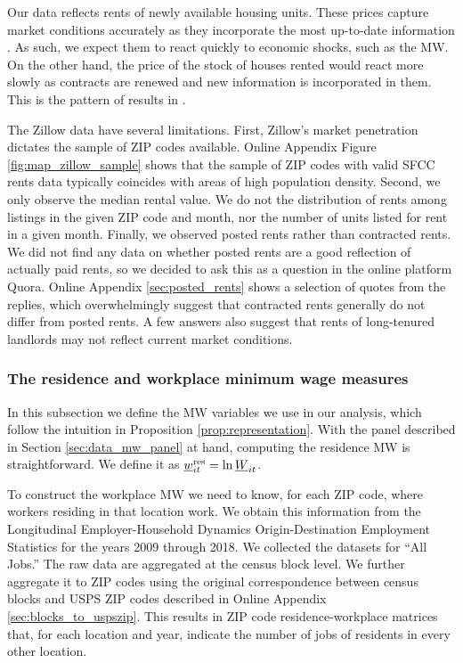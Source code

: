 Our data reflects rents of newly available housing units.
These prices capture market conditions accurately as they incorporate the most
up-to-date information \parencite{AmbroseEtAl2015}.
As such, we expect them to react quickly to economic shocks, such as the MW.
On the other hand, the price of the stock of houses rented would react more 
slowly as contracts are renewed and new information is incorporated in them.
This is the pattern of results in  \textcite{AgarwalEtAl2021}.

The Zillow data have several limitations.
First, Zillow's market penetration dictates the sample of ZIP codes available.
Online Appendix Figure \ref{fig:map_zillow_sample} shows that the sample of ZIP 
codes with valid SFCC rents data typically coincides with areas of high 
population density.
Second, we only observe the median rental value.
We do not the distribution of rents among listings in the given ZIP code and 
month, nor the number of units listed for rent in a given month.
Finally, we observed posted rents rather than contracted rents.
We did not find any data on whether posted rents are a good reflection of 
actually paid rents, so we decided to ask this as a question in the online 
platform Quora.
Online Appendix \ref{sec:posted_rents} shows a selection of quotes from the 
replies, which overwhelmingly suggest that contracted rents generally do not 
differ from posted rents.
A few answers also suggest that rents of long-tenured landlords may not
reflect current market conditions.

\subsubsection{The residence and workplace minimum wage measures}
\label{sec:data_mw_measures}

In this subsection we define the MW variables we use in our analysis,
which follow the intuition in Proposition \ref{prop:representation}.
With the panel described in Section \ref{sec:data_mw_panel} at hand, computing 
the residence MW is straightforward.
We define it as $\underline{w}^{\text{res}}_{it} = \ln \underline{W}_{it}$.

To construct the workplace MW we need to know, for each ZIP code, where workers 
residing in that location work.
We obtain this information from the Longitudinal Employer-Household 
Dynamics Origin-Destination Employment Statistics \parencite[LODES;][]{CensusLODES}
for the years 2009 through 2018.
We collected the datasets for ``All Jobs.''
The raw data are aggregated at the census block level. 
We further aggregate it to ZIP codes using the original correspondence between 
census blocks and USPS ZIP codes described in Online Appendix 
\ref{sec:blocks_to_uspszip}.
This results in ZIP code residence-workplace matrices that, for each location 
and year, indicate the number of jobs of residents in every other location.


